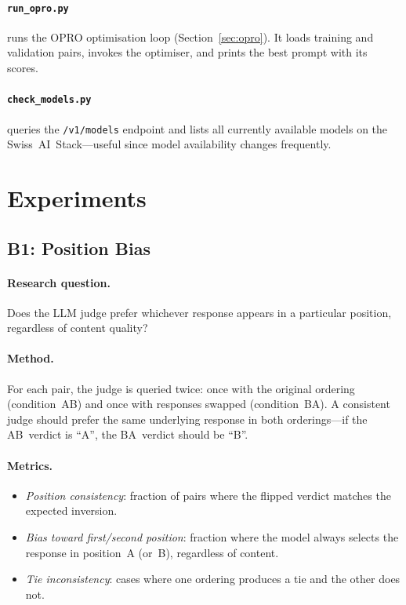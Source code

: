 \documentclass[11pt,a4paper]{article}
\begin{document}
\paragraph{\texttt{run\_opro.py}} runs the OPRO optimisation loop
(Section~\ref{sec:opro}). It loads training and validation pairs, invokes
the optimiser, and prints the best prompt with its scores.

\paragraph{\texttt{check\_models.py}} queries the \texttt{/v1/models} endpoint
and lists all currently available models on the Swiss~AI~Stack---useful since
model availability changes frequently.


\newpage
\section{Experiments}\label{sec:experiments}

\subsection{B1: Position Bias}\label{sec:b1}

\paragraph{Research question.}
Does the LLM judge prefer whichever response appears in a particular position,
regardless of content quality?

\paragraph{Method.}
For each pair, the judge is queried twice: once with the original ordering
(condition~AB) and once with responses swapped (condition~BA). A consistent
judge should prefer the same underlying response in both orderings---if the
AB~verdict is ``A'', the BA~verdict should be ``B''.

\paragraph{Metrics.}
\begin{itemize}[nosep]
  \item \textit{Position consistency}: fraction of pairs where the flipped
        verdict matches the expected inversion.
  \item \textit{Bias toward first/second position}: fraction where the model
        always selects the response in position~A (or~B), regardless of content.
  \item \textit{Tie inconsistency}: cases where one ordering produces a tie
        and the other does not.
\end{itemize}
\end{document}
